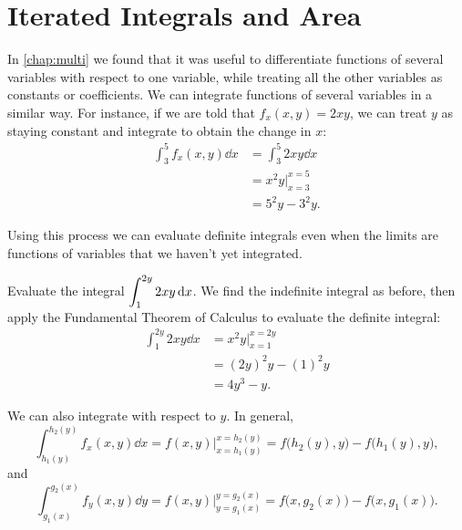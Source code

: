 \section{Iterated Integrals and Area}\label{sec:iterated_integrals}

In \autoref{chap:multi} we found that it was useful to differentiate functions of several variables with respect to one variable, while treating all the other variables as constants or coefficients. We can integrate functions of several variables in a similar way. For instance, if we are told that $f_x(x,y) = 2xy$, we can treat $y$ as staying constant and integrate to obtain the change in $x$: %
\begin{align*}
	\int_3^5 f_x(x,y)\dd x
	&= \int_3^5 2xy\dd x \\
	&= x^2y\Bigr\rvert_{x=3}^{x=5} \\
	&= 5^2y-3^2y. %
\end{align*}

Using this process we can evaluate definite integrals even when the limits are functions of variables that we haven't yet integrated.

\begin{example}\label{ex_iterated1}%
Evaluate the integral $\displaystyle \int_1^{2y} 2xy\operatorname{d}\! x$.
\solution
We find the indefinite integral as before, then apply the Fundamental Theorem of Calculus to evaluate the definite integral:
\begin{align*}
 \int_1^{2y} 2xy\dd x
 &= x^2y\Big|_{x=1}^{x=2y}\\
 &= (2y)^2y - (1)^2y \\
 &= 4y^3-y.
\end{align*}
\end{example}

We can also integrate with respect to $y$. In general,
\[\int_{h_1(y)}^{h_2(y)} f_x(x,y)\dd x = f(x,y)\Big|_{x=h_1(y)}^{x=h_2(y)} = f\bigl(h_2(y),y\bigr)-f\bigl(h_1(y),y\bigr),\]
and
\[\int_{g_1(x)}^{g_2(x)} f_y(x,y)\dd y = f(x,y)\Big|_{y=g_1(x)}^{y=g_2(x)} = f\bigl(x,g_2(x)\bigr)-f\bigl(x,g_1(x)\bigr).\]

